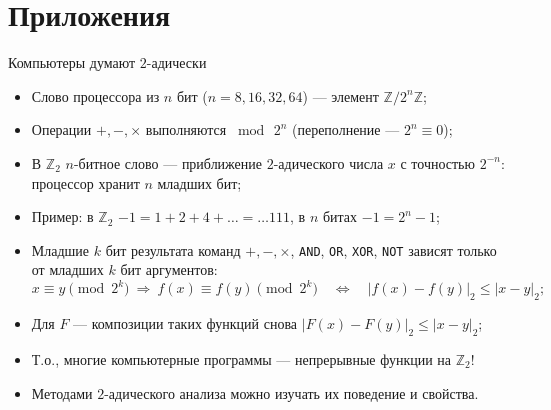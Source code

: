 \documentclass[serif, aspectratio=169]{beamer}
\begin{document}
\section{Приложения}

\begin{frame}{Компьютеры думают $2$-адически}
    \begin{itemize}
        \item Слово процессора из $n$ бит ($n=8,16,32,64$) --- элемент $\mathbb{Z}/2^n\mathbb{Z}$;
        \item Операции $+,-,\times$ выполняются $\bmod\,2^n$ (переполнение --- $2^n\equiv 0$);
        \item В $\mathbb{Z}_2$ $n$-битное слово --- приближение $2$-адического числа $x$ с точностью $2^{-n}$: процессор хранит $n$ младших бит;
        \item Пример: в $\mathbb{Z}_2$ $-1=1+2+4+\dots=\dots111$, в $n$ битах $-1=2^n-1$;
        \item Младшие $k$ бит результата команд $+,-,\times$, \texttt{AND}, \texttt{OR}, \texttt{XOR}, \texttt{NOT} зависят только от младших $k$ бит аргументов:
        \[x\equiv y\pmod{2^k} \ \Rightarrow\ f(x)\equiv f(y)\pmod{2^k} \quad \Leftrightarrow \quad |f(x)-f(y)|_2\leqslant|x-y|_2;\]
        \item Для $F$ --- композиции таких функций снова $|F(x)-F(y)|_2\leqslant|x-y|_2$;
        \item Т.о., многие компьютерные программы --- непрерывные функции на $\mathbb{Z}_2$!
        \item Методами $2$-адического анализа можно изучать их поведение и свойства.
    \end{itemize}
    
\end{frame}
\end{document}
